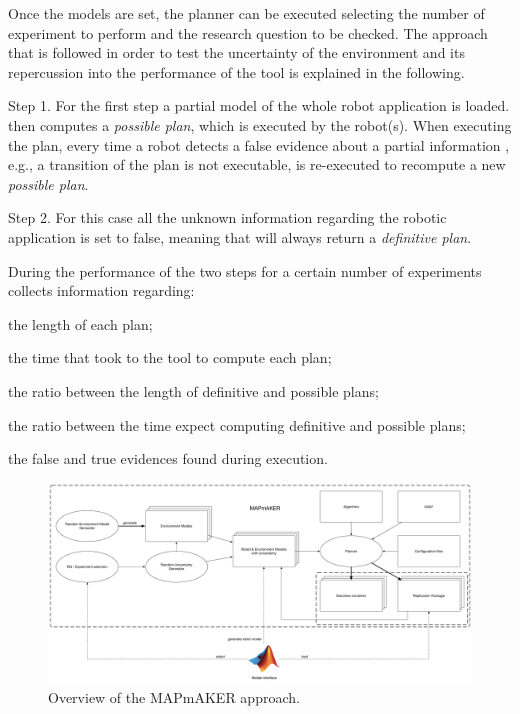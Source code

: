 Once the models are set, the planner can be executed selecting the number of experiment to perform and the research question to be checked.
The approach that is followed in order to test the uncertainty of the environment and its repercussion into the performance of the tool is explained in the following.

Step 1. For the first step a partial model of the whole robot application is loaded. 
\toolName then computes a \emph{possible plan}, which is executed by the robot(s).
When executing the plan, every time a robot detects a false evidence about a partial information , e.g., a transition of the plan is not executable, \toolName is re-executed to recompute a new \emph{possible plan}.

Step 2. For this case all the unknown information regarding the robotic application is set to false, meaning that \toolName will always return a \emph{definitive plan}.

During the performance of the two steps for a certain number of experiments \toolName collects information regarding:
\begin{enumerate*}
\item the length of each plan;
\item the time that took to the tool to compute each plan;
\item the ratio between the length of definitive and possible plans;
\item the ratio between the time expect computing definitive and possible plans;
\item the false and true evidences found during execution.
\end{enumerate*}

\begin{figure}[!t]
\begin{center}
\includegraphics[width=1\linewidth]{Figures/MAPmAKER.pdf}
\caption{Overview of the MAPmAKER approach.}
\label{fig:overview}
\end{center}
\end{figure}





